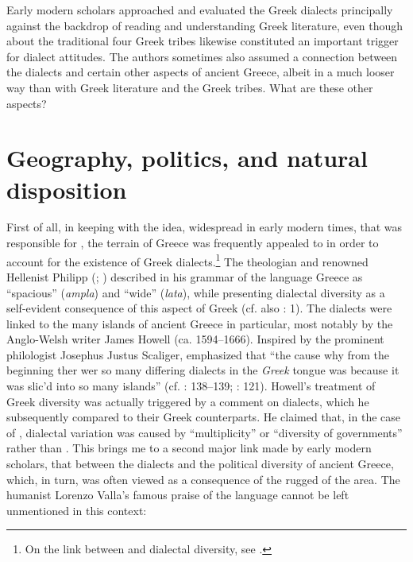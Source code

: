 Early modern scholars approached and evaluated the Greek dialects principally against the backdrop of reading and understanding Greek literature, even though  about the traditional four Greek tribes likewise constituted an important trigger for dialect attitudes. The authors sometimes also assumed a connection between the dialects and certain other aspects of ancient Greece, albeit in a much looser way than with Greek literature and the Greek tribes. What are these other aspects?

\section{Geography, politics, and natural disposition}\label{sec:7.5}


First of all, in keeping with the idea, widespread in early modern times, that  was responsible for , the terrain of Greece was frequently appealed to in order to account for the existence of Greek dialects.\footnote{On the link between  and dialectal diversity, see \citet[]{VanRooyFcd}.} The  theologian and renowned Hellenist Philipp \citeauthor{Melanchthon1518} (\citeyear[a.1\textsc{\textsuperscript{v}}]{Melanchthon1518}; \citeyear[\textsc{a.}i\textsc{\textsuperscript{v}}]{Melanchthon1520}) described in his grammar of the language Greece as “spacious” (\textit{ampla}) and “wide” (\textit{lata}), while presenting dialectal diversity as a self-evident consequence of this aspect of Greek  (cf. also \citealt{Ruland1556}: 1). The dialects were linked to the many islands of ancient Greece in particular, most notably by the Anglo-Welsh writer James Howell (ca. 1594–1666). Inspired by the prominent philologist Josephus Justus Scaliger, \citet[89]{Howell1650b} emphasized that “the cause why from the beginning ther wer so many differing dialects in the \textit{Greek} tongue was because it was slic’d into so many islands” (cf. \citealt{Howell1642}: 138–139; \citealt{Scaliger1610}: 121). Howell’s treatment of Greek diversity was actually triggered by a comment on  dialects, which he subsequently compared to their Greek counterparts. He claimed that, in the case of , dialectal variation was caused by “multiplicity” or “diversity of governments” rather than . This brings me to a second major link made by early modern scholars, that between the dialects and the political diversity of ancient Greece, which, in turn, was often viewed as a consequence of the rugged  of the area. The humanist Lorenzo Valla’s famous praise of the  language cannot be left unmentioned in this context:

